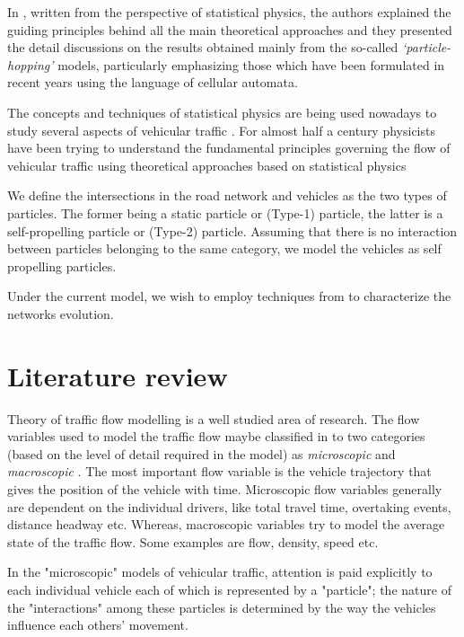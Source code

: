 \documentclass[a4paper,12pt]{scrartcl}
\begin{document}
In \cite{chowdhury2000PR}, written from the perspective of statistical physics, the authors explained the guiding principles behind all the main theoretical approaches and they presented the detail discussions on the results obtained mainly from the so-called \emph{‘particle-hopping'} models, particularly emphasizing those which have been formulated in recent years using the language of cellular automata.

The concepts and techniques of statistical physics are being used nowadays to study several
aspects of vehicular traffic \cite{wolf1996WS,schreckenberg1998WS}.
For almost half a century physicists have been trying to understand the fundamental principles governing the flow of vehicular traffic using theoretical approaches based on statistical physics \cite{herman1963SA,prigogine1971TRID}

We define the intersections in the road network and vehicles as the two types of particles. The former being a static particle or (Type-1) particle, the latter is a self-propelling particle or (Type-2) particle. Assuming that there is no interaction between particles belonging to the same category, we model the vehicles as self propelling particles.

Under the current model, we wish to employ techniques from \cite{ChengCoRR2017} to characterize the networks evolution. 

\newpage
\section{Literature review}
Theory of traffic flow modelling is a well studied area of research. The flow variables used to model the traffic flow maybe classified in to two categories (based on the level of detail required in the model) as \emph{microscopic} and \emph{macroscopic} \cite{hoogendoorn2001JSCE}. The most important flow variable is the vehicle trajectory that gives the position of the vehicle with time. Microscopic flow variables generally are dependent on the individual drivers, like total travel time, overtaking events, distance headway etc. Whereas, macroscopic variables try to model the average state of the traffic flow. Some examples are flow, density, speed etc. 

In the "microscopic" models of vehicular traffic, attention is paid explicitly to each individual
vehicle each of which is represented by a "particle"; the nature of the "interactions" among these particles is determined by the way the vehicles influence each others’ movement.
\end{document}
